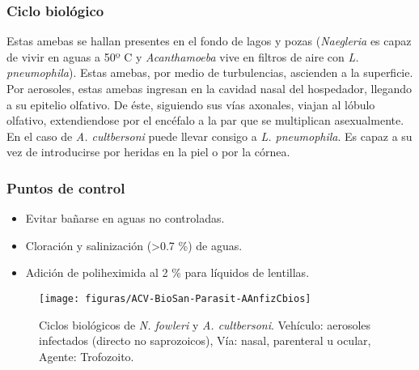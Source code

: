 \documentclass[10pt,a4paper,onecolumn,openany]{book}
\begin{document}
\subsubsection{Ciclo biológico}
Estas amebas se hallan presentes en el fondo de lagos y pozas (\textit{Naegleria} es capaz de vivir en aguas a 50º C y \textit{Acanthamoeba} vive en filtros de aire con \textit{L. pneumophila}). Estas amebas, por medio de turbulencias, ascienden a la superficie. Por aerosoles, estas amebas ingresan en la cavidad nasal del hospedador, llegando a su epitelio olfativo. De éste, siguiendo sus vías axonales, viajan al lóbulo olfativo, extendiendose por el encéfalo a la par que se multiplican asexualmente. En el caso de \textit{A. cultbersoni} puede llevar consigo a \textit{L. pneumophila}. Es capaz a su vez de introducirse por heridas en la piel o por la córnea.
\subsubsection{Puntos de control}
\begin{itemize}[itemsep=0pt,parsep=0pt,topsep=0pt,partopsep=0pt]
	\item Evitar bañarse en aguas no controladas.
	\item Cloración y salinización (>0.7 \%) de aguas.
	\item Adición de poliheximida al 2 \% para líquidos de lentillas.
\end{itemize}
\begin{figure}[H]
	\centering
	\texttt{[image: figuras/ACV-BioSan-Parasit-AAnfizCbios]}
	\caption{Ciclos biológicos de \textit{N. fowleri} y \textit{A. cultbersoni}. Vehículo: aerosoles infectados (directo no saprozoicos), Vía: nasal, parenteral u ocular, Agente: Trofozoito.\label{fig:PARASIT:AAnfizCBios}}
\end{figure}
\end{document}
